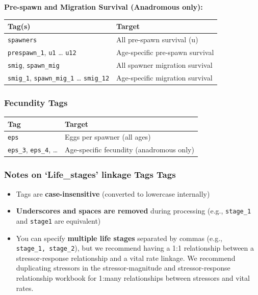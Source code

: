 \documentclass[
  letterpaper,
  DIV=11,
  numbers=noendperiod]{scrreprt}
\providecommand{\tightlist}{%
  \setlength{\itemsep}{0pt}\setlength{\parskip}{0pt}}
\begin{document}
\textbf{Pre-spawn and Migration Survival (Anadromous only):}

\begin{longtable}[]{@{}
  >{\raggedright\arraybackslash}p{}
  >{\raggedright\arraybackslash}p{}@{}}
\toprule\noalign{}
\begin{minipage}[b]{\linewidth}\raggedright
Tag(s)
\end{minipage} & \begin{minipage}[b]{\linewidth}\raggedright
Target
\end{minipage} \\
\midrule\noalign{}
\endhead
\bottomrule\noalign{}
\endlastfoot
\texttt{spawners} & All pre-spawn survival (u) \\
\texttt{prespawn\_1}, \texttt{u1} \ldots{} \texttt{u12} & Age-specific
pre-spawn survival \\
\texttt{smig}, \texttt{spawn\_mig} & All spawner migration survival \\
\texttt{smig\_1}, \texttt{spawn\_mig\_1} \ldots{} \texttt{smig\_12} &
Age-specific migration survival \\
\end{longtable}

\subsubsection{Fecundity Tags}\label{fecundity-tags}

\begin{longtable}[]{@{}ll@{}}
\toprule\noalign{}
Tag & Target \\
\midrule\noalign{}
\endhead
\bottomrule\noalign{}
\endlastfoot
\texttt{eps} & Eggs per spawner (all ages) \\
\texttt{eps\_3}, \texttt{eps\_4}, \ldots{} & Age-specific fecundity
(anadromous only) \\
\end{longtable}

\subsubsection{\texorpdfstring{Notes on \textbf{`Life\_stages' linkage
Tags}
Tags}{Notes on `Life\_stages' linkage Tags Tags}}\label{notes-on-life_stages-linkage-tags-tags}

\begin{itemize}
\tightlist
\item
  Tags are \textbf{case-insensitive} (converted to lowercase internally)
\item
  \textbf{Underscores and spaces are removed} during processing (e.g.,
  \texttt{stage\_1} and \texttt{stage1} are equivalent)
\item
  You can specify \textbf{multiple life stages} separated by commas
  (e.g., \texttt{stage\_1,\ stage\_2}), but we recommend having a 1:1
  relationship between a stressor-response relationship and a vital rate
  linkage. We recommend duplicating stressors in the stressor-magnitude
  and stressor-response relationship workbook for 1:many relationships
  between stressors and vital rates.
\end{itemize}
\end{document}

